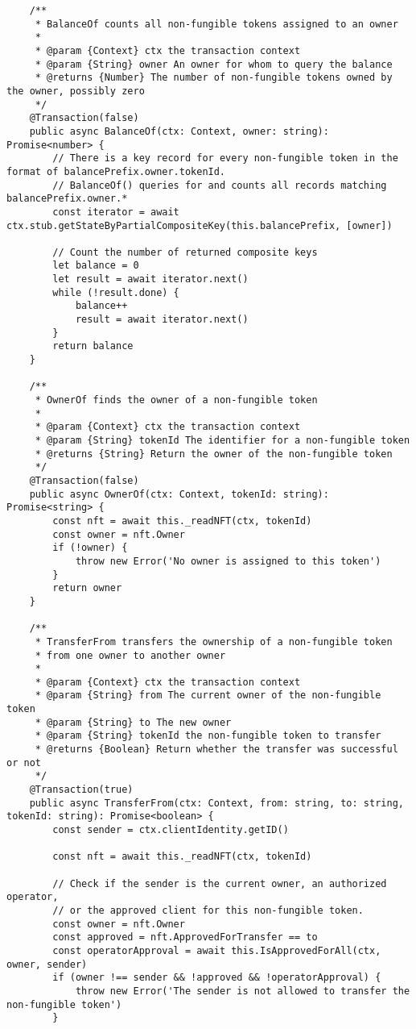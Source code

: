 \begin{lstlisting}
    /**
     * BalanceOf counts all non-fungible tokens assigned to an owner
     *
     * @param {Context} ctx the transaction context
     * @param {String} owner An owner for whom to query the balance
     * @returns {Number} The number of non-fungible tokens owned by the owner, possibly zero
     */
    @Transaction(false)
    public async BalanceOf(ctx: Context, owner: string): Promise<number> {
        // There is a key record for every non-fungible token in the format of balancePrefix.owner.tokenId.
        // BalanceOf() queries for and counts all records matching balancePrefix.owner.*
        const iterator = await ctx.stub.getStateByPartialCompositeKey(this.balancePrefix, [owner])

        // Count the number of returned composite keys
        let balance = 0
        let result = await iterator.next()
        while (!result.done) {
            balance++
            result = await iterator.next()
        }
        return balance
    }

    /**
     * OwnerOf finds the owner of a non-fungible token
     *
     * @param {Context} ctx the transaction context
     * @param {String} tokenId The identifier for a non-fungible token
     * @returns {String} Return the owner of the non-fungible token
     */
    @Transaction(false)
    public async OwnerOf(ctx: Context, tokenId: string): Promise<string> {
        const nft = await this._readNFT(ctx, tokenId)
        const owner = nft.Owner
        if (!owner) {
            throw new Error('No owner is assigned to this token')
        }
        return owner
    }

    /**
     * TransferFrom transfers the ownership of a non-fungible token
     * from one owner to another owner
     *
     * @param {Context} ctx the transaction context
     * @param {String} from The current owner of the non-fungible token
     * @param {String} to The new owner
     * @param {String} tokenId the non-fungible token to transfer
     * @returns {Boolean} Return whether the transfer was successful or not
     */
    @Transaction(true)
    public async TransferFrom(ctx: Context, from: string, to: string, tokenId: string): Promise<boolean> {
        const sender = ctx.clientIdentity.getID()

        const nft = await this._readNFT(ctx, tokenId)

        // Check if the sender is the current owner, an authorized operator,
        // or the approved client for this non-fungible token.
        const owner = nft.Owner
        const approved = nft.ApprovedForTransfer == to
        const operatorApproval = await this.IsApprovedForAll(ctx, owner, sender)
        if (owner !== sender && !approved && !operatorApproval) {
            throw new Error('The sender is not allowed to transfer the non-fungible token')
        }


\end{lstlisting}
